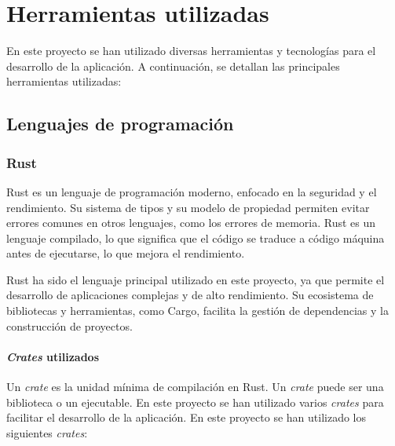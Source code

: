 \chapter{Herramientas utilizadas} \label{apx:herramientas_usadas}

\noindent En este proyecto se han utilizado diversas herramientas y tecnologías para el desarrollo de la aplicación. A continuación, se detallan las principales herramientas utilizadas:

\section{Lenguajes de programación}

\subsection{Rust}

Rust es un lenguaje de programación moderno, enfocado en la seguridad y el rendimiento. Su sistema de tipos y su modelo de propiedad permiten evitar errores comunes en otros lenguajes, como los errores de memoria. Rust es un lenguaje compilado, lo que significa que el código se traduce a código máquina antes de ejecutarse, lo que mejora el rendimiento.

Rust ha sido el lenguaje principal utilizado en este proyecto, ya que permite el desarrollo de aplicaciones complejas y de alto rendimiento. Su ecosistema de bibliotecas y herramientas, como Cargo, facilita la gestión de dependencias y la construcción de proyectos.

\subsubsection{\textit{Crates} utilizados}

Un \textit{crate} es la unidad mínima de compilación en Rust. Un \textit{crate} puede ser una biblioteca o un ejecutable. En este proyecto se han utilizado varios \textit{crates} para facilitar el desarrollo de la aplicación. En este proyecto se han utilizado los siguientes \textit{crates}:

